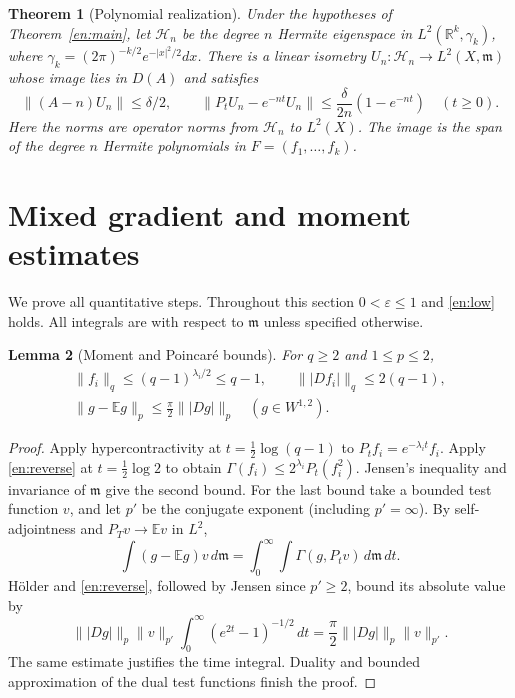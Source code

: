 \documentclass[12pt]{amsart}
\newtheorem{thm}{Theorem}[section]
\newtheorem{lem}[thm]{Lemma}
\theoremstyle{definition}
\theoremstyle{remark}
\numberwithin{equation}{section}
\newcommand{\R}{\mathbb{R}}
\newcommand{\dm}{\,d\mathfrak m}
\newcommand{\E}{\mathbb E}
\newcommand{\gauss}{\gamma_k}
\newcommand{\eps}{\varepsilon}
\theoremstyle{plain}
\begin{document}
\begin{thm}[Polynomial realization]\label{en:realization}
Under the hypotheses of Theorem~\ref{en:main}, let $\mathcal H_n$
be the degree $n$ Hermite eigenspace in $L^2(\R^k,\gauss)$, where
$\gauss=(2\pi)^{-k/2}e^{-|x|^2/2}dx$.
There is a linear isometry $U_n:\mathcal H_n\to L^2(X,\mathfrak m)$
whose image lies in $D(A)$ and satisfies
\begin{equation}\label{en:realizationeq}
 \|(A-n)U_n\|\leq\delta/2,\qquad
 \|P_tU_n-e^{-nt}U_n\|\leq\frac{\delta}{2n}(1-e^{-nt})
 \quad(t\geq0).
\end{equation}
Here the norms are operator norms from $\mathcal H_n$ to $L^2(X)$.
The image is the span of the degree $n$ Hermite polynomials in
$F=(f_1,\ldots,f_k)$.
\end{thm}

\section{Mixed gradient and moment estimates}
We prove all quantitative steps. Throughout this section $0<\eps\leq1$
and \eqref{en:low} holds. All integrals are with respect to $\mathfrak m$
unless specified otherwise.

\begin{lem}[Moment and Poincar\'e bounds]\label{en:integrability}
For $q\geq2$ and $1\leq p\leq2$,
\begin{equation}\label{en:integrabilityeq}
 \begin{gathered}
 \|f_i\|_q\leq(q-1)^{\lambda_i/2}\leq q-1,
 \qquad \||Df_i|\|_q\leq2(q-1),\\
 \|g-\E g\|_p\leq\frac\pi2\||Dg|\|_p
 \quad(g\in W^{1,2}).
 \end{gathered}
\end{equation}
\end{lem}
\begin{proof}
Apply hypercontractivity at $t=\frac12\log(q-1)$ to
$P_tf_i=e^{-\lambda_it}f_i$. Apply \eqref{en:reverse} at
$t=\frac12\log2$ to obtain
$\Gamma(f_i)\leq2^{\lambda_i}P_t(f_i^2)$. Jensen's inequality and
invariance of $\mathfrak m$ give the second bound.
For the last bound take a bounded test function $v$, and let $p'$ be
the conjugate exponent (including $p'=\infty$). By self-adjointness and
$P_Tv\to\E v$ in $L^2$,
\[
 \int(g-\E g)v\dm=\int_0^\infty\int\Gamma(g,P_tv)\dm\,dt.
\]
H\"older and \eqref{en:reverse}, followed by Jensen since $p'\geq2$,
bound its absolute value by
\[
 \||Dg|\|_p\|v\|_{p'}
 \int_0^\infty(e^{2t}-1)^{-1/2}\,dt
 =\frac\pi2\||Dg|\|_p\|v\|_{p'}.
\]
The same estimate justifies the time integral. Duality and bounded
approximation of the dual test functions finish the proof.
\end{proof}
\end{document}
